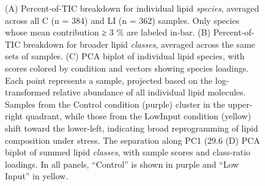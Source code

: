 \documentclass[10pt,letterpaper]{article}
\begin{document}
\begin{figure}[htp]
  \caption{%
    (A) Percent‐of‐TIC breakdown for individual lipid \emph{species}, averaged across all C (n = 384) and LI (n = 362) samples. Only species whose mean contribution ≥ 3 \% are labeled in‐bar.  
    (B) Percent‐of‐TIC breakdown for broader lipid \emph{classes}, averaged across the same sets of samples.  
    (C) PCA biplot of individual lipid species, with scores colored by condition and vectors showing species loadings. Each point represents a sample, projected based on the log-transformed relative abundance of all individual lipid molecules. Samples from the Control condition (purple) cluster in the upper-right quadrant, while those from the LowInput condition (yellow) shift toward the lower-left, indicating broad reprogramming of lipid composition under stress. The separation along PC1 (29.6%
    (D) PCA biplot of summed lipid \emph{classes}, with sample scores and class‐ratio loadings.  
    In all panels, “Control” is shown in purple and “Low Input” in yellow.}
  \label{fig:lipid_main}
\end{figure}
\end{document}
